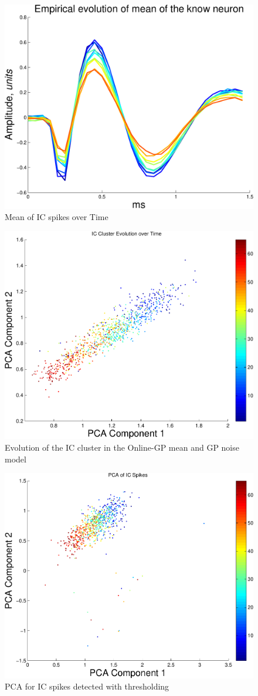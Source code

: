 \documentclass{article} %
\begin{document}
\begin{figure}
\includegraphics[width=\textwidth]{evohc1}
\caption{Mean of IC spikes over Time}
\end{figure}
\begin{figure}
\includegraphics[width=\textwidth]{clusterevo}
\caption{Evolution of the IC cluster in the Online-GP mean and GP noise model}
\end{figure}
\begin{figure}
\includegraphics[width=\textwidth]{clustertrueevo}
\caption{PCA for IC spikes detected with thresholding}
\end{figure}
\end{document}
